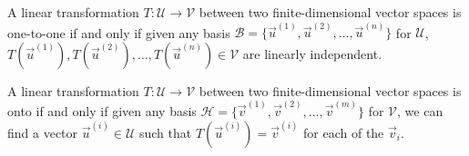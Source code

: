 \begin{thm}
\label{thm:oneto_onebasis}
A linear transformation $T: \mathcal{U} \to \mathcal{V}$ between two finite-dimensional vector spaces is one-to-one if and only if given any basis $\mathcal{B} = \{\vec{u}^{(1)}, \vec{u}^{(2)}, \ldots, \vec{u}^{(n)}\}$ for $\mathcal{U}$, $T(\vec{u}^{(1)}), T(\vec{u}^{(2)}), \ldots, T(\vec{u}^{(n)}) \in \mathcal{V}$ are linearly independent.
\end{thm}
\begin{thm}
\label{thm:onto_basis}
A linear transformation $T: \mathcal{U} \to \mathcal{V}$ between two finite-dimensional vector spaces is onto if and only if given any basis $\mathcal{H} = \{\vec{v}^{(1)}, \vec{v}^{(2)}, \ldots, \vec{v}^{(m)}\}$ for $\mathcal{V}$, we can find a vector $\vec{u}^{(i)} \in \mathcal{U}$ such that $T(\vec{u}^{(i)}) = \vec{v}^{(i)}$ for each of the $\vec{v}_i$.
\end{thm}
